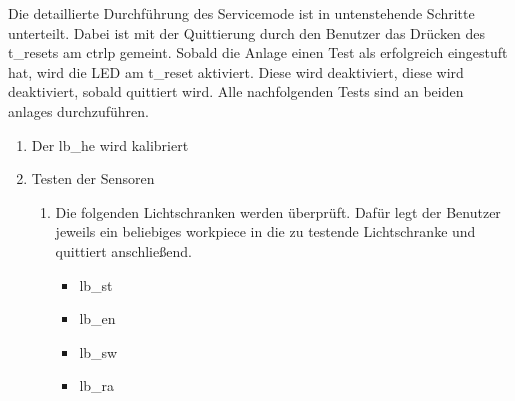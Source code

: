 Die detaillierte Durchführung des Servicemode ist in untenstehende Schritte unterteilt.
Dabei ist mit der Quittierung durch den Benutzer das Drücken des \gls{t_reset}s am \gls{ctrlp} gemeint.
Sobald die Anlage einen Test als erfolgreich eingestuft hat, wird die LED am \gls{t_reset} aktiviert.
Diese wird deaktiviert, diese wird deaktiviert, sobald quittiert wird.
Alle nachfolgenden Tests sind an beiden \glspl{anlage} durchzuführen.
\begin{enumerate}
    \item Der \gls{lb_he} wird kalibriert
    \item Testen der Sensoren
    \begin{enumerate}
        \item Die folgenden Lichtschranken werden überprüft.
        Dafür legt der Benutzer jeweils ein beliebiges \gls{workpiece} in die zu testende Lichtschranke und
        quittiert anschließend.
        \begin{itemize}
            \item \gls{lb_st}
            \item \gls{lb_en}
            \item \gls{lb_sw}
            \item \gls{lb_ra}
        \end{itemize}


\end{enumerate}
\end{enumerate}

